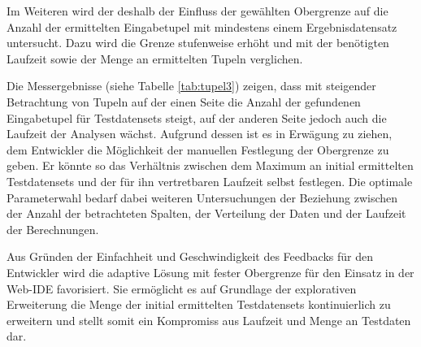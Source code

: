 Im Weiteren wird der deshalb der Einfluss der gewählten Obergrenze auf die Anzahl der ermittelten Eingabetupel mit mindestens einem Ergebnisdatensatz untersucht.
Dazu wird die Grenze stufenweise erhöht und mit der benötigten Laufzeit sowie der Menge an ermittelten Tupeln verglichen.

Die Messergebnisse (siehe Tabelle \ref{tab:tupel3}) zeigen, dass mit steigender Betrachtung von Tupeln auf der einen Seite die Anzahl der gefundenen Eingabetupel für Testdatensets steigt, auf der anderen Seite jedoch auch die Laufzeit der Analysen wächst.
Aufgrund dessen ist es in Erwägung zu ziehen, dem Entwickler die Möglichkeit der manuellen Festlegung der Obergrenze zu geben.
Er könnte so das Verhältnis zwischen dem Maximum an initial ermittelten Testdatensets und der für ihn vertretbaren Laufzeit selbst festlegen.
Die optimale Parameterwahl bedarf dabei weiteren Untersuchungen der Beziehung zwischen der Anzahl der betrachteten Spalten, der Verteilung der Daten und der Laufzeit der Berechnungen.

\begin{table}[h]
	\centering
	\caption{Auswirkung der Wahl der Obergrenze auf Anzahl der Eingabetupel und Laufzeit}
	\label{tab:tupel3}
\end{table}

Aus Gründen der Einfachheit und Geschwindigkeit des Feedbacks für den Entwickler wird die adaptive Lösung mit fester Obergrenze für den Einsatz in der Web-IDE favorisiert.
Sie ermöglicht es auf Grundlage der explorativen Erweiterung die Menge der initial ermittelten Testdatensets kontinuierlich zu erweitern und stellt somit ein Kompromiss aus Laufzeit und Menge an Testdaten dar.







